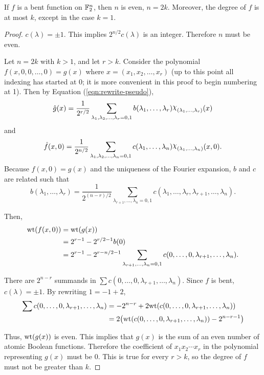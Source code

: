 \begin{theorem}{\rm \cite{art:r76}}\label{thm:deg-of-bent-function}
  If $f$ is a bent function on $\mathbb{F}_2^n$, then $n$ is even, $n=2k$.
  Moreover,
  the degree of $f$ is at most $k$, except in the case $k=1$.
\end{theorem}
\begin{proof}
  \par $c(\lambda)=\pm1$. This implies $2^{n/2}c(\lambda)$ is an
  integer. Therefore $n$ must be even.
  \par Let $n=2k$ with $k>1$, and let $r>k$. Consider the polynomial
  $f(x,\allowbreak 0,0,\dots,0)=\allowbreak g(x)$ where $x=(x_1,x_2,\dots,x_r)$
  (up to this point all indexing has
  started at 0; it is more convenient in this proof to begin numbering at
  1). Then by Equation (\ref{eqn:rewrite-pseudo}),
  \[
  \hat{g}(x)=\frac{1}{2^{r/2}}\sum_{\lambda_1,\lambda_2,\dots,\lambda_r=0,1}
    b(\lambda_1,\dots,\lambda_r)\Chi_{(\lambda_1,\ldots,\lambda_r)}(x)
  \]
  and
  \[
  \hat{f}(x,0)=\frac{1}{2^{n/2}}
    \sum_{\lambda_1,\lambda_2,\dots,\lambda_n=0,1}
    c(\lambda_1,\dots,\lambda_n)\Chi_{(\lambda_1,\ldots,\lambda_n)}(x,0).
  \]
  Because $f(x,0)=g(x)$ and the uniqueness of the Fourier expansion, $b$ and
  $c$ are related such that
  \[
  b(\lambda_1,\dots,\lambda_r)
    =\frac{1}{2^{(n-r)/2}}\sum_{\lambda_{r+1},\dots,\lambda_n=0,1}
    c(\lambda_1,\dots,\lambda_r,\lambda_{r+1},\dots,\lambda_n).
  \]
  \par Then,
  \begin{align*}
  {\rm wt}(f(x,0))&={\rm wt}(g(x))\\
    &=2^{r-1}-2^{r/2-1}b(0)\\
    &=2^{r-1}-2^{r-n/2-1}\sum_{\lambda_{r+1},\dots,\lambda_n=0,1}
      c(0,\dots,0,\lambda_{r+1},\dots,\lambda_n).
  \end{align*}
  \par There are $2^{n-r}$ summands in
  $\sum{c(0,\dots,0,\lambda_{r+1},\dots,\lambda_n)}.$ Since $f$ is bent,
  $c(\lambda)=\pm1$. By rewriting $1=-1+2$,
  \begin{align*}
    \sum{c(0,\dots,0,\lambda_{r+1},\dots,\lambda_n)}
      &=-2^{n-r}+2{\rm wt}(c(0,\dots,0,\lambda_{r+1},\dots,\lambda_n))\\
      &=2\big({\rm wt}(c(0,\dots,0,\lambda_{r+1},\dots,\lambda_n))-2^{n-r-1}\big)
  \end{align*}
  \par Thus, ${\rm wt}(g(x))$ is even. This implies that $g(x)$ is the sum of an
  even number of atomic Boolean functions. Therefore the coefficient of
  $x_1x_2\cdots x_r$ in the polynomial representing $g(x)$ must be 0. This
  is true for every $r>k$, so the degree of $f$ must not be greater than
  $k$.
\end{proof}

